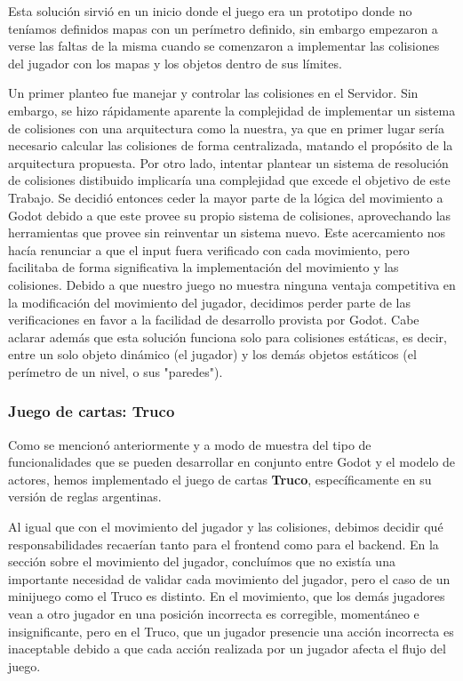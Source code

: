 Esta solución sirvió en un inicio donde el juego era un prototipo donde no teníamos definidos 
mapas con un perímetro definido, sin embargo empezaron a verse las faltas de la misma cuando 
se comenzaron a implementar las colisiones del jugador con los mapas y los objetos dentro de sus límites.

Un primer planteo fue manejar y controlar las colisiones en el Servidor. Sin embargo, se hizo rápidamente aparente
la complejidad de implementar un sistema de colisiones con una arquitectura como la nuestra, ya que en primer lugar
sería necesario calcular las colisiones de forma centralizada, matando el propósito de la arquitectura propuesta.
Por otro lado, intentar plantear un sistema de resolución de colisiones distibuido implicaría una complejidad que excede
el objetivo de este Trabajo.
Se decidió entonces ceder la mayor parte de la lógica del movimiento a Godot debido a que este provee 
su propio sistema de colisiones, aprovechando las herramientas que provee sin reinventar un sistema 
nuevo. Este acercamiento nos hacía renunciar a que el input fuera 
verificado con cada movimiento, pero facilitaba de forma significativa la implementación del 
movimiento y las colisiones. Debido a que nuestro juego no muestra ninguna ventaja competitiva 
en la modificación del movimiento del jugador, decidimos perder parte de las verificaciones en 
favor a la facilidad de desarrollo provista por Godot.
Cabe aclarar además que esta solución funciona solo para colisiones estáticas, es decir, entre un solo objeto
dinámico (el jugador) y los demás objetos estáticos (el perímetro de un nivel, o sus "paredes").

\subsubsection{Juego de cartas: Truco}
\noindent Como se mencionó anteriormente y a modo de muestra del tipo de funcionalidades que se pueden
desarrollar en conjunto entre Godot y el modelo de actores, hemos implementado el juego de cartas \textbf{Truco},
específicamente en su versión de reglas argentinas.

Al igual que con el movimiento del jugador y las colisiones, debimos decidir qué 
responsabilidades recaerían tanto para el frontend como para el backend. En la sección 
sobre el movimiento del jugador, concluímos que no existía una importante necesidad de 
validar cada movimiento del jugador, pero el caso de un minijuego como el Truco es distinto. 
En el movimiento, que los demás jugadores vean a otro jugador en una posición incorrecta es 
corregible, momentáneo e insignificante, pero en el Truco, que un jugador presencie una acción 
incorrecta es inaceptable debido a que cada acción realizada por un jugador afecta el flujo del juego.

